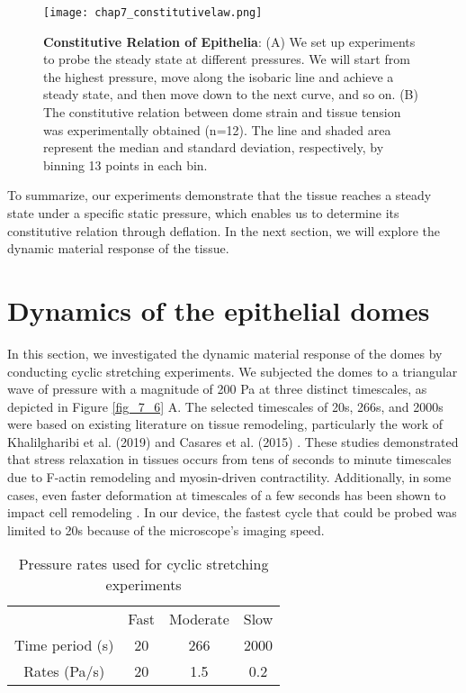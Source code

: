 \begin{figure}[b!]
	\centering
	\texttt{[image: chap7\_constitutivelaw.png]}
	\caption{\label{fig_7_5} \textbf{Constitutive Relation of Epithelia}: (A) We set up experiments to probe the steady state at different pressures. We will start from the highest pressure, move along the isobaric line and achieve a steady state, and then move down to the next curve, and so on.	(B) The constitutive relation between dome strain and tissue tension was experimentally obtained (n=12). The line and shaded area represent the median and standard deviation, respectively, by binning 13 points in each bin.}
\end{figure}

To summarize, our experiments demonstrate that the tissue reaches a steady state under a specific static pressure, which enables us to determine its constitutive relation through deflation. In the next section, we will explore the dynamic material response of the tissue.

\vspace{0cm}

\hypertarget{dynamics-of-the-epithelia-domes}{\section{Dynamics of the epithelial domes}\label{dynamics-of-the-epithelial-domes}}

In this section, we investigated the dynamic material response of the domes by conducting cyclic stretching experiments. We subjected the domes to a triangular wave of pressure with a magnitude of 200 Pa at three distinct timescales, as depicted in Figure \ref{fig_7_6} A. The selected timescales of 20s, 266s, and 2000s were based on existing literature on tissue remodeling, particularly the work of Khalilgharibi et al. (2019) and Casares et al. (2015) \cite{khalilgharibi2019, casares2015}. These studies demonstrated that stress relaxation in tissues occurs from tens of seconds to minute timescales due to F-actin remodeling and myosin-driven contractility. Additionally, in some cases, even faster deformation at timescales of a few seconds has been shown to impact cell remodeling \cite{andreu2021a}. In our device, the fastest cycle that could be probed was limited to 20s because of the microscope’s imaging speed.

\begin{center}
	\begin{table}[h!]
		\label{tab:hysteresis}
		\centering
		\begin{tabular}{c c c c}
			& Fast & Moderate & Slow \\ 
			Time period (s) & 20   & 266      & 2000 \\ 
			Rates (Pa/s)    & 20   & 1.5      & 0.2  \\ 
		\end{tabular}
		\caption{Pressure rates used for cyclic stretching experiments}
	\end{table}
\end{center}

